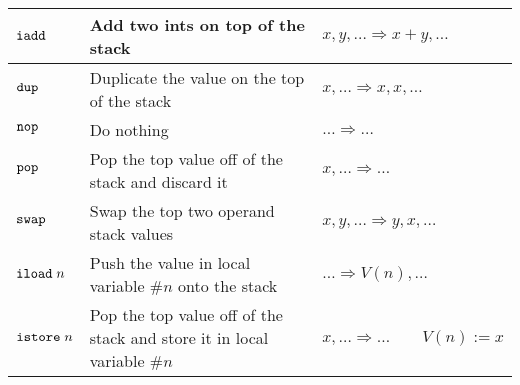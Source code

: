 \documentclass[11pt]{article}
\begin{document}
\begin{enumerate}
\begin{center}
\begin{tabular}{|l|p{3.2in}|l|}
          $\texttt{iadd}$ &
          Add two ints on top of the stack &
          $x, y, \ldots \Rightarrow x+y, \ldots$ \\ \hline

          $\texttt{dup}$ &
          Duplicate the value on the top of the stack &
          $x, \ldots \Rightarrow x, x, \ldots$ \\ \hline

          $\texttt{nop}$ &
          Do nothing &
          $\ldots \Rightarrow \ldots$ \\ \hline

          $\texttt{pop}$ &
          Pop the top value off of the stack and discard it &
          $x, \ldots \Rightarrow \ldots$ \\ \hline

          $\texttt{swap}$ &
          Swap the top two operand stack values &
          $x, y, \ldots \Rightarrow y, x, \ldots$ \\ \hline

          $\texttt{iload}\;n$ &
          Push the value in local variable \#$n$ onto the stack &
          $\ldots \Rightarrow V(n), \ldots$ \\ \hline

          \multirow{2}{*}{$\texttt{istore}\;n$} &
          Pop the top value off of the stack and store it in local variable
            \#$n$ &
          \multirow{2}{*}{$x, \ldots \Rightarrow \ldots \qquad V(n) := x$}
            \\ \hline
        \end{tabular}
      \end{center}
      


\end{enumerate}
\end{document}
